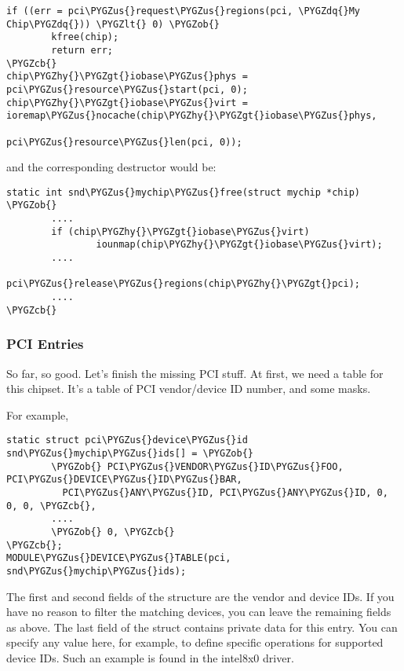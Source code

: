 \documentclass[a4paper,8pt,english]{sphinxmanual}
\def\PYGZus{\char`\_}
\def\PYGZob{\char`\{}
\def\PYGZcb{\char`\}}
\def\PYGZlt{\char`\<}
\def\PYGZgt{\char`\>}
\def\PYGZhy{\char`\-}
\def\PYGZdq{\char`\"}
\begin{document}
\begin{Verbatim}[commandchars=\\\{\}]
if ((err = pci\PYGZus{}request\PYGZus{}regions(pci, \PYGZdq{}My Chip\PYGZdq{})) \PYGZlt{} 0) \PYGZob{}
        kfree(chip);
        return err;
\PYGZcb{}
chip\PYGZhy{}\PYGZgt{}iobase\PYGZus{}phys = pci\PYGZus{}resource\PYGZus{}start(pci, 0);
chip\PYGZhy{}\PYGZgt{}iobase\PYGZus{}virt = ioremap\PYGZus{}nocache(chip\PYGZhy{}\PYGZgt{}iobase\PYGZus{}phys,
                                    pci\PYGZus{}resource\PYGZus{}len(pci, 0));
\end{Verbatim}

and the corresponding destructor would be:

\begin{Verbatim}[commandchars=\\\{\}]
static int snd\PYGZus{}mychip\PYGZus{}free(struct mychip *chip)
\PYGZob{}
        ....
        if (chip\PYGZhy{}\PYGZgt{}iobase\PYGZus{}virt)
                iounmap(chip\PYGZhy{}\PYGZgt{}iobase\PYGZus{}virt);
        ....
        pci\PYGZus{}release\PYGZus{}regions(chip\PYGZhy{}\PYGZgt{}pci);
        ....
\PYGZcb{}
\end{Verbatim}


\subsubsection{PCI Entries}
\label{sound/kernel-api/writing-an-alsa-driver:pci-entries}
So far, so good. Let's finish the missing PCI stuff. At first, we need a
 table for
this chipset. It's a table of PCI vendor/device ID number, and some
masks.

For example,

\begin{Verbatim}[commandchars=\\\{\}]
static struct pci\PYGZus{}device\PYGZus{}id snd\PYGZus{}mychip\PYGZus{}ids[] = \PYGZob{}
        \PYGZob{} PCI\PYGZus{}VENDOR\PYGZus{}ID\PYGZus{}FOO, PCI\PYGZus{}DEVICE\PYGZus{}ID\PYGZus{}BAR,
          PCI\PYGZus{}ANY\PYGZus{}ID, PCI\PYGZus{}ANY\PYGZus{}ID, 0, 0, 0, \PYGZcb{},
        ....
        \PYGZob{} 0, \PYGZcb{}
\PYGZcb{};
MODULE\PYGZus{}DEVICE\PYGZus{}TABLE(pci, snd\PYGZus{}mychip\PYGZus{}ids);
\end{Verbatim}

The first and second fields of the  structure are the vendor and device IDs. If you
have no reason to filter the matching devices, you can leave the
remaining fields as above. The last field of the  struct contains private data
for this entry. You can specify any value here, for example, to define
specific operations for supported device IDs. Such an example is found
in the intel8x0 driver.
\end{document}
